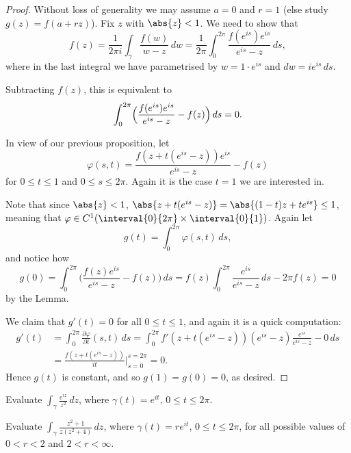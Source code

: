 \begin{proof}
	Without loss of generality we may assume $a = 0$ and $r = 1$ (else study $g(z) = f(a + r z)$).
	Fix $z$ with $\abs{z} < 1$.
	We need to show that
	\[
		f(z) = \frac{1}{2 \pi i} \int_\gamma \frac{f(w)}{w - z} \, d w = \frac{1}{2 \pi} \int_0^{2 \pi} \frac{f(e^{i s}) e^{i s}}{e^{i s} - z} \, d s,
	\]
	where in the last integral we have parametrised by $w = 1 \cdot e^{i s}$ and $d w = i e^{i s} \, d s$.

	Subtracting $f(z)$, this is equivalent to
	\[
		\int_0^{2 \pi} \Bigl ( \frac{f(e^{i s}) e^{i s}}{e^{i s} - z} - f(z) \Bigr ) \, d s = 0.
	\]

	In view of our previous proposition, let
	\[
		\varphi(s, t) = \frac{f(z + t(e^{i s} - z)) e^{i s}}{e^{i s} - z} - f(z)
	\]
	for $0 \leq t \leq 1$ and $0 \leq s \leq 2 \pi$.
	Again it is the case $t = 1$ we are interested in.

	Note that since $\abs{z} < 1$, $\abs{z + t(e^{i s} - z)} = \abs{(1 - t) z + t e^{i s}} \leq 1$, meaning that $\varphi \in C^1(\interval{0}{2 \pi} \times \interval{0}{1})$.
	Again let
	\[
		g(t) = \int_0^{2 \pi} \varphi(s, t) \, d s,
	\]
	and notice how
	\[
		g(0) = \int_0^{2 \pi} \Bigr ( \frac{f(z) e^{i s}}{e^{i s} - z} - f(z) \Bigr ) \, d s = f(z) \int_0^{2 \pi} \frac{e^{i s}}{e^{i s} - z} \, d s - 2 \pi f(z) = 0
	\]
	by the Lemma.

	We claim that $g'(t) = 0$ for all $0 \leq t \leq 1$, and again it is a quick computation:
	\begin{align*}
		g'(t) &= \int_0^{2 \pi} \frac{\partial \varphi}{\partial t} (s, t) \, d s = \int_0^{2 \pi} f'(z + t(e^{i s} - z)) (e^{i s} - z) \frac{e^{i s}}{e^{i s} - z} - 0 \, d s \\
		&= \frac{f(z + t(e^{i s} - z))}{i t} \biggr\rvert_{s = 0}^{s = 2 \pi} = 0.
	\end{align*}
	Hence $g(t)$ is constant, and so $g(1) = g(0) = 0$, as desired.
\end{proof}

\begin{exercise}
	Evaluate $\displaystyle \int_\gamma \frac{e^{i z}}{z^2} \, d z$, where $\gamma(t) = e^{i t}$, $0 \leq t \leq 2 \pi$.
\end{exercise}

\begin{exercise}
	Evaluate $\displaystyle \int_\gamma \frac{z^2 + 1}{z(z^2 + 4)} \, d z$, where $\gamma(t) = r e^{i t}$, $0 \leq t \leq 2 \pi$, for all possible values of $0 < r < 2$ and $2 < r < \infty$.
\end{exercise}

